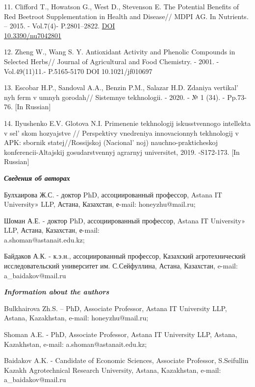 \begin{references}
11. Clifford T., Howatson G., West D., Stevenson E. The Potential
Benefits of Red Beetroot Supplement\-ation in Health and Disease// MDPI
AG. In Nutrients. -- 2015. - Vol.7(4)- P.2801--2822.
\href{https://doi.org/10.3390/nu7042801}{DOI \\10.3390/nu7042801}

12. Zheng W., Wang S. Y. Antioxidant Activity and Phenolic Compounds in
Selected Herbs// Journal of Agricultural and Food Chemistry. - 2001. -
Vol.49(11)11.- P.5165-5170 DOI 10.1021/jf010697

13. Escobar H.P., Sandoval A.A., Benzin P.M., Salazar H.D. Zdaniya
vertikal' nyh ferm v umnyh gorodah// Sistemnye
tekhnologii. - 2020. - № 1 (34). - Pp.73-76. {[}In Russian{]}

14. Ilyushenko E.V. Glotova N.I. Primenenie tekhnologij iskusstvennogo
intellekta v sel' skom hozyajstve // Perspektivy
vnedreniya innovacionnyh tekhnologij v APK: sbornik statej//Rossijskoj
(Nacional' noj) nauchno-prakticheskoj
konferencii-Altajskij gosudarstvennyj agrarnyj universitet,
2019. -S172-173. {[}In Russian{]}
\end{references}

\begin{authorinfo}
\emph{{\bfseries Сведения об авторах}}

Булхаирова Ж.С. - доктор PhD, ассоциированный профессор, Astana IT
University» LLP, Астана, Казахстан, е-mail: honeyzhu@mail.ru;

Шоман А.Е. - доктор PhD, ассоциированный профессор, Astana IT
University» LLP, Астана, Казахстан, е-mail: \\a.shoman@astanait.edu.kz;

Байдаков А.К. - к.э.н., ассоциированный профессор, Казахский
агротехнический исследовательский университет им. С.Сейфуллина, Астана,
Казахстан, e-mail: a\_baidakov@mail.ru

\emph{{\bfseries Information about the authors}}

Bulkhairova Zh.S. -- PhD, Associate Professor, Astana IT University LLP,
Astana, Kazakhstan, e-mail: honeyzhu@mail.ru;

Shoman A.E. - PhD, Associate Professor, Astana IT University LLP,
Astana, Kazakhstan, e-mail: a.shoman@astanait.edu.kz;

Baidakov A.K. - Candidate of Economic Sciences, Associate Professor,
S.Seifullin Kazakh Agrotechnical Research University, Astana,
Kazakhstan, e-mail: a\_baidakov@mail.ru
\end{authorinfo}
